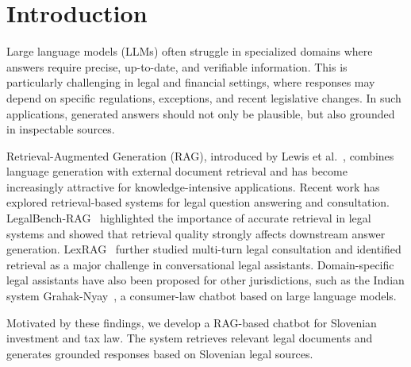\documentclass[fleqn,moreauthors,10pt]{ds_report}
\affiliation{\textit{Advisors: Slavko Žitnik}}
\begin{document}
\flushbottom

\maketitle

\thispagestyle{empty}


\section*{Introduction}

Large language models (LLMs) often struggle in specialized domains where answers require precise, up-to-date, and verifiable information. This is particularly challenging in legal and financial settings, where responses may depend on specific regulations, exceptions, and recent legislative changes. In such applications, generated answers should not only be plausible, but also grounded in inspectable sources.

Retrieval-Augmented Generation (RAG), introduced by Lewis et al.~\cite{rag}, combines language generation with external document retrieval and has become increasingly attractive for knowledge-intensive applications. Recent work has explored retrieval-based systems for legal question answering and consultation. LegalBench-RAG~\cite{legalbenchrag} highlighted the importance of accurate retrieval in legal systems and showed that retrieval quality strongly affects downstream answer generation. LexRAG~\cite{lexrag} further studied multi-turn legal consultation and identified retrieval as a major challenge in conversational legal assistants. Domain-specific legal assistants have also been proposed for other jurisdictions, such as the Indian system Grahak-Nyay~\cite{grahaknyay}, a consumer-law chatbot based on large language models.

Motivated by these findings, we develop a RAG-based chatbot for Slovenian investment and tax law. The system retrieves relevant legal documents and generates grounded responses based on Slovenian legal sources.



\end{document}
